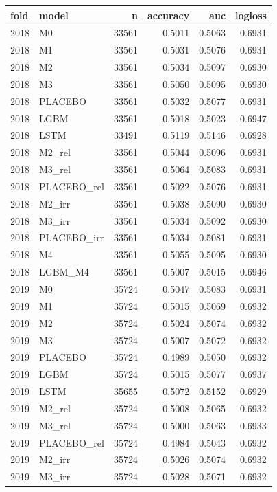 \begin{tabular}{llrrrr}
\toprule
fold & model & n & accuracy & auc & logloss \\
\midrule
2018 & M0 & 33561 & 0.5011 & 0.5063 & 0.6931 \\
2018 & M1 & 33561 & 0.5031 & 0.5076 & 0.6931 \\
2018 & M2 & 33561 & 0.5034 & 0.5097 & 0.6930 \\
2018 & M3 & 33561 & 0.5050 & 0.5095 & 0.6930 \\
2018 & PLACEBO & 33561 & 0.5032 & 0.5077 & 0.6931 \\
2018 & LGBM & 33561 & 0.5018 & 0.5023 & 0.6947 \\
2018 & LSTM & 33491 & 0.5119 & 0.5146 & 0.6928 \\
2018 & M2\_rel & 33561 & 0.5044 & 0.5096 & 0.6931 \\
2018 & M3\_rel & 33561 & 0.5064 & 0.5083 & 0.6931 \\
2018 & PLACEBO\_rel & 33561 & 0.5022 & 0.5076 & 0.6931 \\
2018 & M2\_irr & 33561 & 0.5038 & 0.5090 & 0.6930 \\
2018 & M3\_irr & 33561 & 0.5034 & 0.5092 & 0.6930 \\
2018 & PLACEBO\_irr & 33561 & 0.5034 & 0.5081 & 0.6931 \\
2018 & M4 & 33561 & 0.5055 & 0.5095 & 0.6930 \\
2018 & LGBM\_M4 & 33561 & 0.5007 & 0.5015 & 0.6946 \\
2019 & M0 & 35724 & 0.5047 & 0.5083 & 0.6931 \\
2019 & M1 & 35724 & 0.5015 & 0.5069 & 0.6932 \\
2019 & M2 & 35724 & 0.5024 & 0.5074 & 0.6932 \\
2019 & M3 & 35724 & 0.5007 & 0.5072 & 0.6932 \\
2019 & PLACEBO & 35724 & 0.4989 & 0.5050 & 0.6932 \\
2019 & LGBM & 35724 & 0.5015 & 0.5077 & 0.6937 \\
2019 & LSTM & 35655 & 0.5072 & 0.5152 & 0.6929 \\
2019 & M2\_rel & 35724 & 0.5008 & 0.5065 & 0.6932 \\
2019 & M3\_rel & 35724 & 0.5000 & 0.5063 & 0.6933 \\
2019 & PLACEBO\_rel & 35724 & 0.4984 & 0.5043 & 0.6932 \\
2019 & M2\_irr & 35724 & 0.5026 & 0.5074 & 0.6932 \\
2019 & M3\_irr & 35724 & 0.5028 & 0.5071 & 0.6932 \\

\end{tabular}
